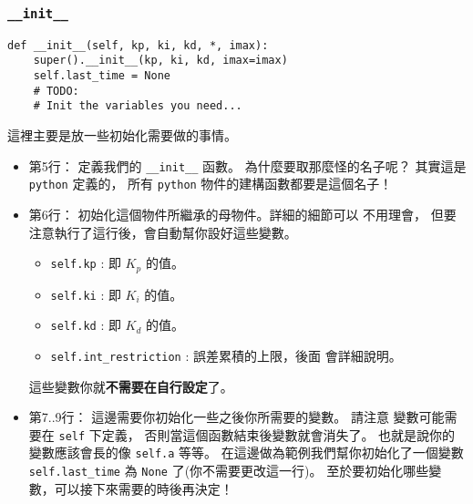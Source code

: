 \documentclass[12pt, a4paper]{article}
\begin{document}
\subsubsection{\texttt{\_\_init\_\_}}
\begin{verbatim}
def __init__(self, kp, ki, kd, *, imax):
    super().__init__(kp, ki, kd, imax=imax)
    self.last_time = None
    # TODO:
    # Init the variables you need...
\end{verbatim}
這裡主要是放一些初始化需要做的事情。
\begin{itemize}
  \itemsep=0pt
  \item 第5行： 定義我們的 \texttt{__init__} 函數。
    為什麼要取那麼怪的名子呢？ 其實這是 \texttt{python} 定義的，
    所有 \texttt{python} 物件的建構函數都要是這個名子！
  \item 第6行： 初始化這個物件所繼承的母物件。詳細的細節可以
    不用理會， 但要注意執行了這行後，會自動幫你設好這些變數。
    \begin{itemize}
      \item \texttt{self.kp} : 即 $K_p$ 的值。
      \item \texttt{self.ki} : 即 $K_i$ 的值。
      \item \texttt{self.kd} : 即 $K_d$ 的值。
      \item \texttt{self.int_restriction} : 誤差累積的上限，後面
        會詳細說明。
    \end{itemize}
    這些變數你就{\bf 不需要在自行設定}了。
  \item 第7..9行：
    這邊需要你初始化一些之後你所需要的變數。 請注意
    變數可能需要在 \texttt{self} 下定義，
    否則當這個函數結束後變數就會消失了。
    也就是說你的變數應該會長的像 \texttt{self.a}
    等等。 在這邊做為範例我們幫你初始化了一個變數
    \texttt{self.last_time} 為 
    \texttt{None} 了(你不需要更改這一行)。
    至於要初始化哪些變數，可以接下來需要的時後再決定！
\end{itemize}
\end{document}
